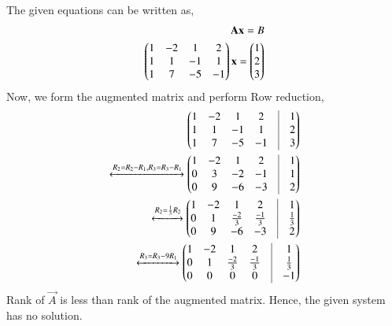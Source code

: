    The given equations can be written as,
   \begin{align}
   \mathbf{A}\mathbf{x}=B\\
  \begin{pmatrix}1&-2&1&2\\1&1&-1&1\\1&7&-5&-1\end{pmatrix}\mathbf{x}=\begin{pmatrix}1\\2\\3\end{pmatrix}
   \end{align}
   Now, we form the augmented matrix and perform Row reduction,
   \begin{align}
      \myvec{1&-2&1&2&\vrule&1\\1&1&-1&1&\vrule&2\\1&7&-5&-1&\vrule&3}\\
        \xleftrightarrow{R_2=R_2-R_1,R_3=R_3-R_1}\myvec{1&-2&1&2&\vrule&1\\0&3&-2&-1&\vrule&1\\0&9&-6&-3&\vrule&2}\\
     \xleftrightarrow{R_2=\frac{1}{3}R_2}\myvec{1&-2&1&2&\vrule&1\\0&1&\frac{-2}{3}&\frac{-1}{3}&\vrule&\frac{1}{3}\\0&9&-6&-3&\vrule&2}\\
      \xleftrightarrow{R_3=R_3-9R_1}\myvec{1&-2&1&2&\vrule&1\\0&1&\frac{-2}{3}&\frac{-1}{3}&\vrule&\frac{1}{3}\\0&0&0&0&\vrule&-1}
\end{align}
Rank of $\vec{A}$ is less than rank of the augmented matrix. Hence, the given system has no solution.
